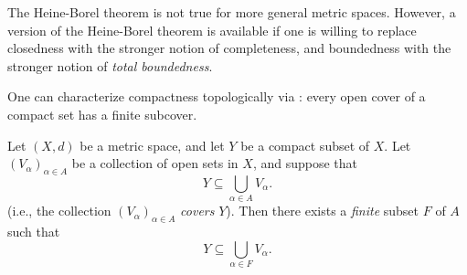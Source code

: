 \begin{note}
  The Heine-Borel theorem is not true for more general metric spaces.
  However, a version of the Heine-Borel theorem is available if one is willing to replace closedness with the stronger notion of completeness, and boundedness with the stronger notion of \emph{total boundedness}.
\end{note}

\begin{note}
  One can characterize compactness topologically via :
  every open cover of a compact set has a finite subcover.
\end{note}

\begin{thm}\label{ii:1.5.8}
  Let \((X, d)\) be a metric space, and let \(Y\) be a compact subset of \(X\).
  Let \((V_{\alpha})_{\alpha \in A}\) be a collection of open sets in \(X\), and suppose that
  \[
    Y \subseteq \bigcup_{\alpha \in A} V_{\alpha}.
  \]
  (i.e., the collection \((V_{\alpha})_{\alpha \in A}\) \emph{covers} \(Y\)).
  Then there exists a \emph{finite} subset \(F\) of \(A\) such that
  \[
    Y \subseteq \bigcup_{\alpha \in F} V_{\alpha}.
  \]
\end{thm}

